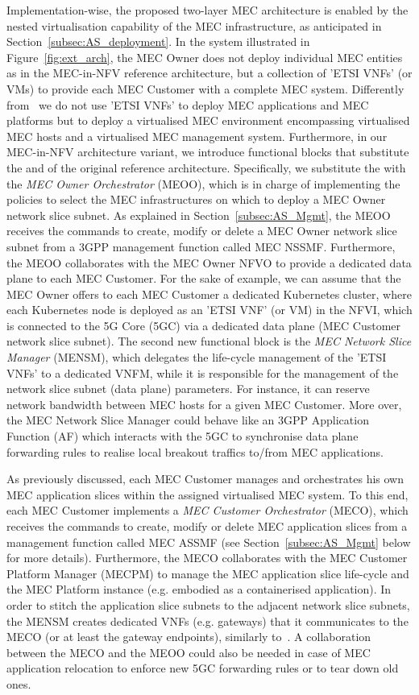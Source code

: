 Implementation-wise, the proposed two-layer MEC architecture is enabled by the nested virtualisation capability of the MEC infrastructure, as anticipated in Section~\ref{subsec:AS_deployment}. In the system illustrated in Figure~\ref{fig:ext_arch}, the MEC Owner does not deploy individual MEC entities as in the MEC-in-NFV reference architecture, but a collection of 'ETSI VNFs' (or VMs) to provide each MEC Customer with a complete MEC system. Differently from~\cite{Cominardi2020} we do not use 'ETSI VNFs' to deploy MEC applications and MEC platforms but to deploy a virtualised MEC environment encompassing virtualised MEC hosts and a virtualised MEC management system. Furthermore, in our MEC-in-NFV architecture variant, we introduce functional blocks that substitute the  and  of the original reference architecture. Specifically, we substitute the  with the \textit{MEC Owner Orchestrator} (MEOO), which is in charge of implementing the policies to select the MEC infrastructures on which to deploy a MEC Owner network slice subnet. As explained in Section~\ref{subsec:AS_Mgmt}, the MEOO receives the commands to create, modify or delete a MEC Owner network slice subnet from a 3GPP management function called MEC NSSMF. Furthermore, the MEOO collaborates with the MEC Owner NFVO to provide a dedicated data plane to each MEC Customer. For the sake of example, we can assume that the MEC Owner offers to each MEC Customer a dedicated Kubernetes cluster, where each Kubernetes node is deployed as an 'ETSI VNF' (or VM) in the NFVI, which is connected to the 5G Core (5GC) via a dedicated data plane (MEC Customer network slice subnet). The second new functional block is the \textit{MEC Network Slice Manager} (MENSM), which delegates the life-cycle management of the 'ETSI VNFs' to a dedicated VNFM, while it is responsible for the management of the network slice subnet (data plane) parameters. For instance, it can reserve network bandwidth between MEC hosts for a given MEC Customer. More over, the MEC Network Slice Manager could behave like an 3GPP Application Function (AF) which interacts with the 5GC to synchronise data plane forwarding rules to realise local breakout traffics to/from MEC applications.

As previously discussed, each MEC Customer manages and orchestrates his own MEC application slices within the assigned virtualised MEC system. To this end, each MEC Customer implements a \textit{MEC Customer Orchestrator} (MECO), which receives the commands to create, modify or delete MEC application slices from a management function called MEC ASSMF (see Section~\ref{subsec:AS_Mgmt} below for more details). Furthermore, the MECO collaborates with the MEC Customer Platform Manager (MECPM) to manage the MEC application slice life-cycle and the MEC Platform instance (e.g. embodied as a containerised application). In order to stitch the application slice subnets to the adjacent network slice subnets, the MENSM creates dedicated VNFs (e.g. gateways) that it communicates to the MECO (or at least the gateway endpoints), similarly to~\cite{2021_TNSM_e22_slice_survey}. A collaboration between the MECO and the MEOO could also be needed in case of MEC application relocation to enforce new 5GC forwarding rules or to tear down old ones.


